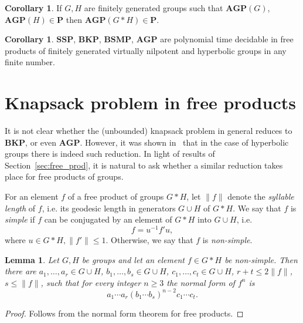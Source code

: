 \documentclass[10pt]{amsart}
\newtheorem{lemma}[theorem]{Lemma}
\theoremstyle{definition}
\newtheorem{corollary}[theorem]{Corollary}
\def\P{{\mathbf{P}}}
\def\SSP{{\mathbf{SSP}}}
\def\BSMP{{\mathbf{BSMP}}}
\def\BKP{{\mathbf{BKP}}}
\def\AGP{{\mathbf{AGP}}}
\def\dumb{simple} %
\def\nondumb{non-simple} %
\begin{document}
\begin{corollary}\label{cor:ptime_agp}
If $G,H$ are finitely generated groups such that $\AGP(G)$, $\AGP(H)\in\P$ then $\AGP(G*H)\in\P$.
\end{corollary}


\begin{corollary}
$\SSP$, $\BKP$, $\BSMP$, $\AGP$ are polynomial time decidable in free products of finitely generated virtually nilpotent and hyperbolic groups in any finite number.
\end{corollary}

\section{Knapsack problem in free products}\label{sec:knapsack}
It is not clear whether the (unbounded) knapsack problem in general reduces to $\BKP$, or even $\AGP$. However, it was shown in~\cite{Miasnikov-Nikolaev-Ushakov:2014a} that in the case of hyperbolic groups there is indeed such reduction. In light of results of Section~\ref{sec:free_prod}, it is natural to ask whether a similar reduction takes place for free products of groups.

For an element $f$ of a free product of groups $G*H$, let $\|f\|$ denote the {\em syllable length} of $f$, i.e. its geodesic length in generators $G\cup H$ of $G*H$. We say that $f$ is {\em \dumb} if $f$ can be conjugated by an element of $G*H$ into $G\cup H$, i.e.
\begin{equation}\label{eq:simple}
f=u^{-1}f'u,
\end{equation}
where $u\in G*H, \|f'\|\le 1$. Otherwise, we say that $f$ is {\em \nondumb}.

\begin{lemma}\label{le:power}
Let $G,H$ be groups and let an element $f\in G\ast H$ be \nondumb.
Then there are $a_1,\ldots,a_r\in G\cup H$, $b_1,\ldots,b_s\in G\cup H$, $c_1,\ldots,c_t\in G\cup H$, $r+t\le 2\|f\|$, $s\le \|f\|$, such that for every integer $n\ge 3$ the normal form of $f^n$ is
$$
a_1\cdots a_r(b_1\cdots b_s)^{n-2}c_1\cdots c_t.
$$
\end{lemma}
\begin{proof} Follows from the normal form theorem for free products.
\end{proof}
\end{document}

